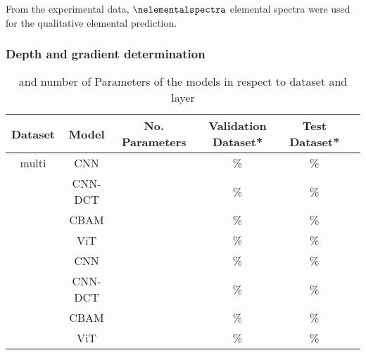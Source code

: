 From the experimental data, $\nelementalspectra$ elemental spectra were used for the qualitative elemental prediction. 

\subsubsection{Depth and gradient determination}



\begin{table}[H]
    \centering
    \begin{tabular}{c|c|c|c|c|c}
        Dataset & Model   & No. Parameters & Validation Dataset*  & Test Dataset*    \\
        \hline
        multi  & CNN     &                &        \%             &             \% \\
               & CNN-DCT &                &       \%              &             \% \\
               & CBAM    &                &       \%              &             \% \\
               & ViT     &                &       \%              &             \% \\
               & CNN     &                &       \%              &             \%  \\
               & CNN-DCT &                &       \%              &             \%  \\
               & CBAM    &                &       \%              &             \% \\
               & ViT     &                &       \%              &             \% \\
    \end{tabular}
    \caption{ and number of Parameters of the models in respect to dataset and layer}
    \label{tab:acc_depth}
\end{table}
